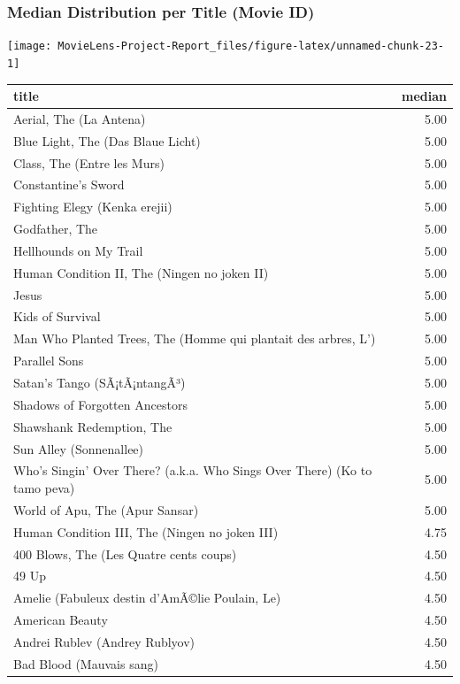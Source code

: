 \documentclass[
]{article}
\begin{document}
\hypertarget{median-distribution-per-title-movie-id}{%
\subsubsection{Median Distribution per Title (Movie
ID)}\label{median-distribution-per-title-movie-id}}

\begin{center}\texttt{[image: MovieLens-Project-Report\_files/figure-latex/unnamed-chunk-23-1]} \end{center}

\begin{table}[!h]
\centering\begingroup\fontsize{10}{12}\selectfont

\begin{tabular}{l|r}
\hline
title & median\\
\hline
Aerial, The (La Antena) & 5.00\\
\hline
Blue Light, The (Das Blaue Licht) & 5.00\\
\hline
Class, The (Entre les Murs) & 5.00\\
\hline
Constantine's Sword & 5.00\\
\hline
Fighting Elegy (Kenka erejii) & 5.00\\
\hline
Godfather, The & 5.00\\
\hline
Hellhounds on My Trail & 5.00\\
\hline
Human Condition II, The (Ningen no joken II) & 5.00\\
\hline
Jesus & 5.00\\
\hline
Kids of Survival & 5.00\\
\hline
Man Who Planted Trees, The (Homme qui plantait des arbres, L') & 5.00\\
\hline
Parallel Sons & 5.00\\
\hline
Satan's Tango (SÃ¡tÃ¡ntangÃ³) & 5.00\\
\hline
Shadows of Forgotten Ancestors & 5.00\\
\hline
Shawshank Redemption, The & 5.00\\
\hline
Sun Alley (Sonnenallee) & 5.00\\
\hline
Who's Singin' Over There? (a.k.a. Who Sings Over There) (Ko to tamo peva) & 5.00\\
\hline
World of Apu, The (Apur Sansar) & 5.00\\
\hline
Human Condition III, The (Ningen no joken III) & 4.75\\
\hline
400 Blows, The (Les Quatre cents coups) & 4.50\\
\hline
49 Up & 4.50\\
\hline
Amelie (Fabuleux destin d'AmÃ©lie Poulain, Le) & 4.50\\
\hline
American Beauty & 4.50\\
\hline
Andrei Rublev (Andrey Rublyov) & 4.50\\
\hline
Bad Blood (Mauvais sang) & 4.50\\
\hline
\end{tabular}
\endgroup{}
\end{table}
\end{document}
